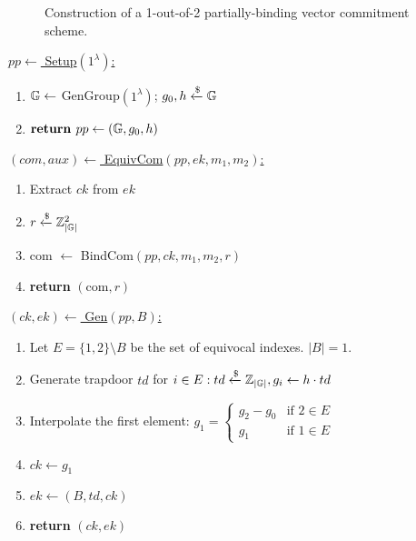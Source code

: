 \begin{figure}[h]
  \caption{Construction of a 1-out-of-2 partially-binding vector commitment scheme.}
  \label{fig:half-binding}
\end{figure}
\begin{breakablefig}
    \begin{minipage}{0.45\linewidth}
      \vspace{-4em}
      \underline{$pp \leftarrow$ Setup$(1^\lambda)$:}
      \begin{enumerate}
        \item $\mathbb{G} \leftarrow $ GenGroup$(1^\lambda)$; $g_0, h \xleftarrow{\$} \mathbb{G}$
        \item $\textbf{return } pp \leftarrow (\mathbb{G}, g_0, h)$
      \end{enumerate}  
    \end{minipage}
    \begin{minipage}{0.5\linewidth}
      \underline{$(com, aux) \leftarrow$ EquivCom$(pp, ek, m_1, m_2)$:}
      \begin{enumerate}
        \item Extract $ck$ from $ek$
        \item $r \xleftarrow{\$} \mathbb{Z}_{|\mathbb{G}|}^2$
        \item com $\leftarrow$ BindCom$(pp,ck,m_1,m_2,r)$
        \item \textbf{return} $(\text{com}, r)$
      \end{enumerate}  
    \end{minipage}

    \underline{$(ck, ek) \leftarrow$ Gen$(pp, B)$:}
    \begin{enumerate}
      \item Let $E = \{1,2\} \setminus B$ be the set of equivocal indexes. $|B| = 1$.
      \item Generate trapdoor $td$ for $i \in E: td \xleftarrow{\$} \mathbb{Z}_{|\mathbb{G}|}, g_i \leftarrow h \cdot td$
      \item Interpolate the first element: $g_1 = \begin{cases}
       g_2 - g_0 & \text{if $2 \in E$} \\
       g_1 & \text{if $1 \in E$}
      \end{cases}$
      \item $ck \leftarrow g_1$
      \item $ek \leftarrow (B, td, ck)$
      \item \textbf{return} $(ck, ek)$
    \end{enumerate}


\end{breakablefig}

